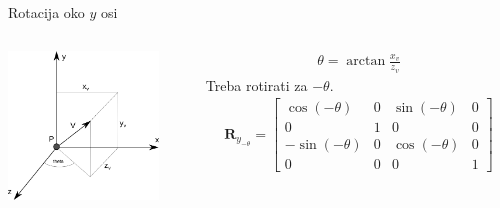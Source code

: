 \documentclass[9pt]{beamer}
\begin{document}
\begin{frame}{Rotacija oko $y$ osi}
	\begin{columns}
		\begin{column}{0.48\textwidth}
			\begin{center}
				\includegraphics[width=4cm]{./slike/p04_02.png}
			\end{center}
		\end{column}
		\begin{column}{0.48\textwidth}
			\begin{align*}
			\theta= \arctan \frac{x_v}{z_v}
			\end{align*}
			Treba rotirati za $-\theta$.
			\begin{align*}
			\mathbf{R}_{y_{-\theta}} = \left[ \begin{array}{cccc}
			\cos (-\theta) & 0 & \sin (-\theta) & 0 \\
			0 & 1 & 0 & 0 \\
			-\sin(-\theta) & 0 & \cos(-\theta) & 0 \\
			0 & 0 & 0 & 1 
			\end{array} \right]
			\end{align*}
		\end{column}
	\end{columns}
\end{frame}
\end{document}
